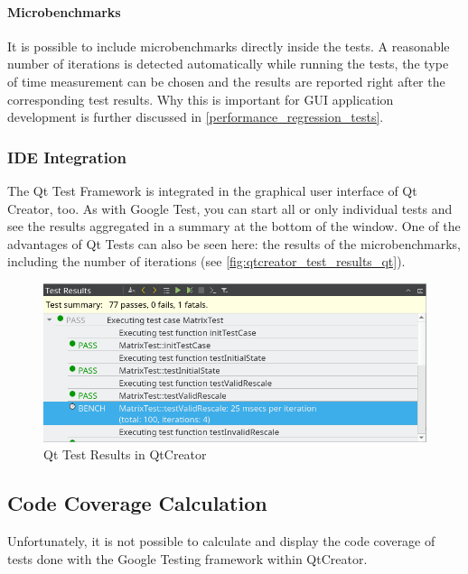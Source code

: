 \documentclass{scrreprt}
\begin{document}
\paragraph{Microbenchmarks}

It is possible to include microbenchmarks directly inside the tests. A reasonable number of iterations is detected automatically while running the tests, the type of time measurement can be chosen and the results are reported right after the corresponding test results. Why this is important for GUI application development is further discussed in \vref{performance_regression_tests}.


\subsubsection{IDE Integration}

The Qt Test Framework is integrated in the graphical user interface of Qt Creator, too. As with Google Test, you can start all or only individual tests and see the results aggregated in a summary at the bottom of the window. One of the advantages of Qt Tests can also be seen here: the results of the microbenchmarks, including the number of iterations (see \vref{fig:qtcreator_test_results_qt}).

\begin{figure}[h]
	\centering
	\includegraphics[width=1.0\textwidth]{img/qtcreator_test_results_qt}
	\caption[QtCreator Qt Test Results]{Qt Test Results in QtCreator}
	\label{fig:qtcreator_test_results_qt}
\end{figure}

\subsection{Code Coverage Calculation}

Unfortunately, it is not possible to calculate and display the code coverage of tests done with the Google Testing framework within QtCreator.
\end{document}
